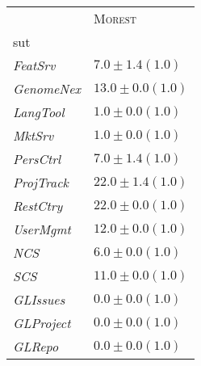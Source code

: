 \begin{tabular}{ll}
\toprule
 & \textsc{Morest} \\
sut &  \\
\midrule
\emph{FeatSrv} & $7.0 \pm 1.4(1.0)$ \\
\emph{GenomeNex} & $13.0 \pm 0.0(1.0)$ \\
\emph{LangTool} & $1.0 \pm 0.0(1.0)$ \\
\emph{MktSrv} & $1.0 \pm 0.0(1.0)$ \\
\emph{PersCtrl} & $7.0 \pm 1.4(1.0)$ \\
\emph{ProjTrack} & $22.0 \pm 1.4(1.0)$ \\
\emph{RestCtry} & $22.0 \pm 0.0(1.0)$ \\
\emph{UserMgmt} & $12.0 \pm 0.0(1.0)$ \\
\emph{NCS} & $6.0 \pm 0.0(1.0)$ \\
\emph{SCS} & $11.0 \pm 0.0(1.0)$ \\
\emph{GLIssues} & $0.0 \pm 0.0(1.0)$ \\
\emph{GLProject} & $0.0 \pm 0.0(1.0)$ \\
\emph{GLRepo} & $0.0 \pm 0.0(1.0)$ \\
\bottomrule
\end{tabular}
